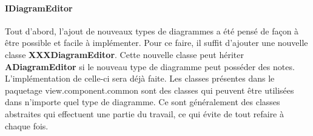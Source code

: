 \documentclass[a4paper,10pt]{article}
\begin{document}
  \paragraph{IDiagramEditor}
    Tout d'abord, l'ajout de nouveaux types de diagrammes a été pensé de façon à être possible et 
    facile à implémenter. 
    Pour ce faire, il suffit d'ajouter une nouvelle classe \textbf{XXXDiagramEditor}. 
    Cette nouvelle classe peut hériter \textbf{ADiagramEditor} si le nouveau type de diagramme peut posséder des notes.
    L'implémentation de celle-ci sera déjà faite. Les classes présentes dans le paquetage view.component.common 
    sont des classes qui peuvent être utilisées dans n'importe quel type de diagramme. Ce
    sont généralement des classes abstraites qui effectuent une partie du travail, ce qui évite de tout refaire à chaque fois.
\end{document}

